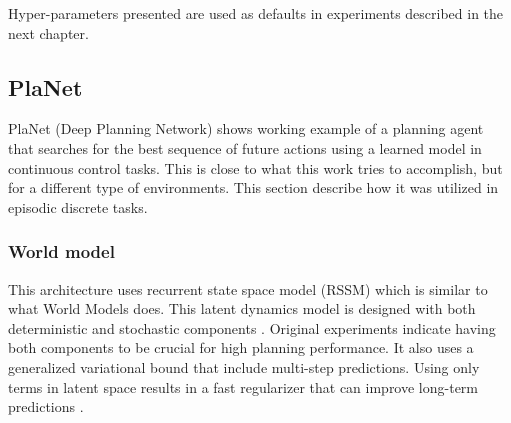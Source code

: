 Hyper-parameters presented are used as defaults in experiments described in the next chapter.

\subsection{PlaNet}

PlaNet (Deep Planning Network) \cite{Algo.PlaNet} shows working example of a planning agent that searches for the best sequence of future actions using a learned model in continuous control tasks. This is close to what this work tries to accomplish, but for a different type of environments. This section describe how it was utilized in episodic discrete tasks.

\subsubsection{World model}

This architecture uses recurrent state space model (RSSM) which is similar to what World Models does. This latent dynamics model is designed with both deterministic and stochastic components \cite{Algo.FastGenerativeModels}. Original experiments indicate having both components to be crucial for high planning performance. It also uses a generalized variational bound that include multi-step predictions. Using only terms in latent space results in a fast regularizer that can improve long-term predictions \cite{Algo.PlaNet}.

